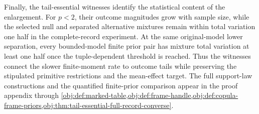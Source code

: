 Finally, the tail-essential witnesses identify the statistical content of the enlargement. For \(p<2\), their outcome magnitudes grow with sample size, while the selected null and separated alternative mixtures remain within total variation one half in the complete-record experiment. At the same original-model lower separation, every bounded-model finite prior pair has mixture total variation at least one half once the tuple-dependent threshold is reached. Thus the witnesses connect the slower finite-moment rate to outcome tails while preserving the stipulated primitive restrictions and the mean-effect target. The full support-law constructions and the quantified finite-prior comparison appear in the proof appendix through \cref{obj:def:marked-table,obj:def:frame-handle,obj:def:copula-frame-priors,obj:thm:tail-essential-full-record-converse}.
